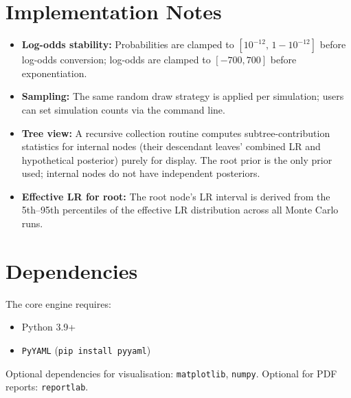 \documentclass[11pt,a4paper]{article}
\begin{document}
\section{Implementation Notes}

\begin{itemize}
\item \textbf{Log-odds stability:} Probabilities are clamped to
  $[10^{-12},\, 1-10^{-12}]$ before log-odds conversion; log-odds are
  clamped to $[-700, 700]$ before exponentiation.
\item \textbf{Sampling:} The same random draw strategy is applied per
  simulation; users can set simulation counts via the command line.
\item \textbf{Tree view:} A recursive collection routine computes
  subtree-contribution statistics for internal nodes (their descendant
  leaves' combined LR and hypothetical posterior) purely for display.
  The root prior is the only prior used; internal nodes do not have
  independent posteriors.
\item \textbf{Effective LR for root:} The root node's LR interval is derived
  from the 5th--95th percentiles of the effective LR distribution across all
  Monte Carlo runs.
\end{itemize}

\section{Dependencies}

The core engine requires:
\begin{itemize}
\item Python 3.9+
\item \texttt{PyYAML} (\texttt{pip install pyyaml})
\end{itemize}

Optional dependencies for visualisation: \texttt{matplotlib}, \texttt{numpy}.
Optional for PDF reports: \texttt{reportlab}.
\end{document}
